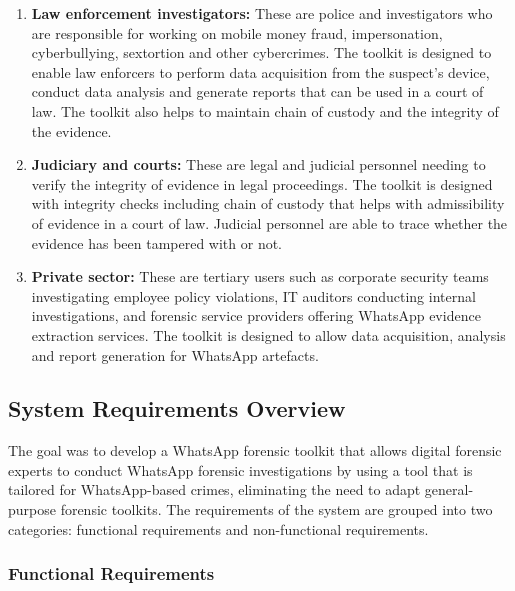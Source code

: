 \documentclass[12pt,a4paper]{report}
\begin{document}
\begin{enumerate}
    \item \textbf{Law enforcement investigators:} These are police and investigators who are responsible for working on mobile money fraud, impersonation, cyberbullying, sextortion and other cybercrimes. The toolkit is designed to enable law enforcers to perform data acquisition from the suspect's device, conduct data analysis and generate reports that can be used in a court of law. The toolkit also helps to maintain chain of custody and the integrity of the evidence.

    \item \textbf{Judiciary and courts:} These are legal and judicial personnel needing to verify the integrity of evidence in legal proceedings. The toolkit is designed with integrity checks including chain of custody that helps with admissibility of evidence in a court of law. Judicial personnel are able to trace whether the evidence has been tampered with or not.

    \item \textbf{Private sector:} These are tertiary users such as corporate security teams investigating employee policy violations, IT auditors conducting internal investigations, and forensic service providers offering WhatsApp evidence extraction services. The toolkit is designed to allow data acquisition, analysis and report generation for WhatsApp artefacts.
\end{enumerate}

\subsection{System Requirements Overview}

The goal was to develop a WhatsApp forensic toolkit that allows digital forensic experts to conduct WhatsApp forensic investigations by using a tool that is tailored for WhatsApp-based crimes, eliminating the need to adapt general-purpose forensic toolkits. The requirements of the system are grouped into two categories: functional requirements and non-functional requirements.

\subsubsection{Functional Requirements}
\end{document}
